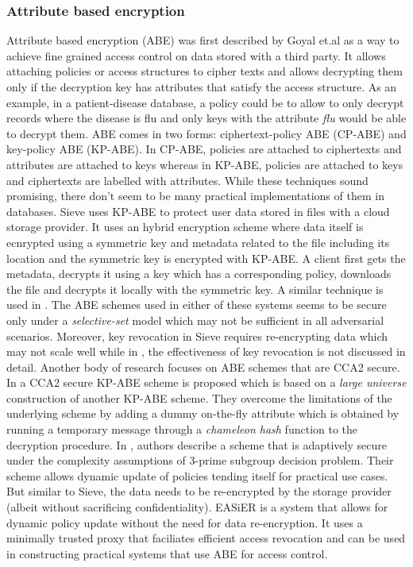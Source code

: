 \subsubsection{Attribute based encryption}
Attribute based encryption (ABE) \cite{abe} was first described by Goyal et.al as a way to achieve fine grained access control on data stored with a third party. It allows attaching policies or access structures to cipher texts and allows decrypting them only if the decryption key has attributes that satisfy the access structure. As an example, in a patient-disease database, a policy could be to allow to only decrypt records where the disease is flu and only keys with the attribute \textit{flu} would be able to decrypt them. ABE comes in two forms: ciphertext-policy ABE (CP-ABE) and key-policy ABE (KP-ABE). In CP-ABE, policies are attached to ciphertexts and attributes are attached to keys whereas in KP-ABE, policies are attached to keys and ciphertexts are labelled with attributes. While these techniques sound promising, there don't seem to be many practical implementations of them in databases. Sieve \cite{sieve} uses KP-ABE to protect user data stored in files with a cloud storage provider. It uses an hybrid encryption scheme where data itself is ecnrypted using a symmetric key and metadata related to the file including its location and the symmetric key is encrypted with KP-ABE. A client first gets the metadata, decrypts it using a key which has a corresponding policy, downloads the file and decrypts it locally with the symmetric key. A similar technique is used in \cite{PPEHR}. The ABE schemes used in either of these systems seems to be secure only under a \textit{selective-set} model which  may not be sufficient in all adversarial scenarios. Moreover, key revocation in Sieve requires re-encrypting data which may not scale well while in \cite{PPEHR}, the effectiveness of key revocation is not discussed in detail.
\newline\newline
Another body of research focuses on ABE schemes that are CCA2 secure. In \cite{cca2_abe1} a CCA2 secure KP-ABE scheme is proposed which is based on a \textit{large universe} construction of another KP-ABE scheme. They overcome the limitations of the underlying scheme by adding a dummy on-the-fly attribute which is obtained by running a temporary message through a \textit{chameleon hash} function to the decryption procedure. In \cite{cca2_abe2}, authors describe a scheme that is adaptively secure under the complexity assumptions of 3-prime subgroup decision problem. Their scheme allows dynamic update of policies tending itself for practical use cases. But similar to Sieve, the data needs to be re-encrypted by the storage provider (albeit without sacrificing confidentiality). EASiER \cite{easier} is a system that allows for dynamic policy update without the need for data re-encryption. It uses a minimally trusted proxy that faciliates efficient access revocation and can be used in constructing practical systems that use ABE for access control.
